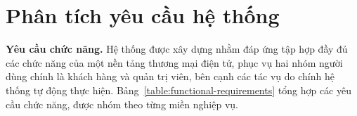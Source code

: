 \documentclass[../DoAn.tex]{subfiles}
\begin{document}


\section{Phân tích yêu cầu hệ thống}
\label{section:4.1}

\textbf{Yêu cầu chức năng.} Hệ thống được xây dựng nhằm đáp ứng tập hợp đầy đủ các chức năng
của một nền tảng thương mại điện tử, phục vụ hai nhóm người dùng chính là khách hàng và quản
trị viên, bên cạnh các tác vụ do chính hệ thống tự động thực hiện. Bảng~\ref{table:functional-requirements}
tổng hợp các yêu cầu chức năng, được nhóm theo từng miền nghiệp vụ.
\end{document}
